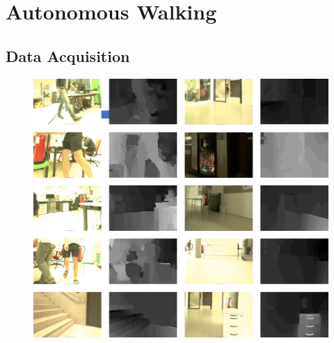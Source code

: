\section{Autonomous Walking}
\label{sec::54_aw}
\subsection{Data Acquisition}
\label{sec::541_da}
\begin{figure}[h]
	\centering
	\includegraphics[scale=.4]{chapters/05_experiments/04_autonomous_walking/dataset_diversity.png}
	\caption{}
	\label{fig::542_dataset}
\end{figure}
